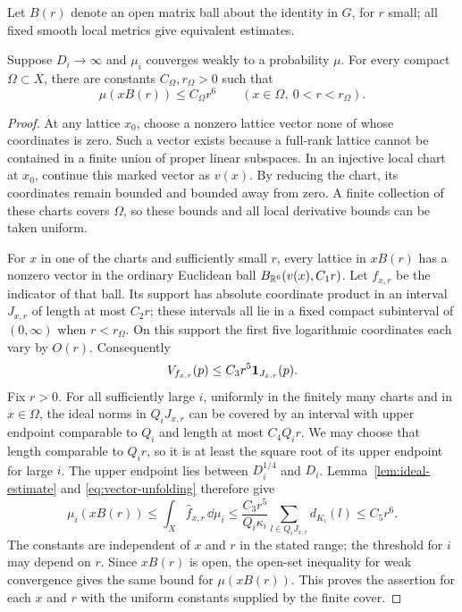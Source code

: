 Let $B(r)$ denote an open matrix ball about the identity in $G$, for
$r$ small; all fixed smooth local metrics give equivalent estimates.

\begin{proposition}
\label{prop:ball}
Suppose $D_i\to\infty$ and $\mu_i$ converges weakly to a probability
$\mu$.  For every compact $\Omega\subset X$, there are constants
$C_\Omega,r_\Omega>0$ such that
\[
 \mu(xB(r))\le C_\Omega r^6
       \qquad(x\in\Omega,\ 0<r<r_\Omega).
\]
\end{proposition}

\begin{proof}
At any lattice $x_0$, choose a nonzero lattice vector none of whose
coordinates is zero.  Such a vector exists because a full-rank lattice
cannot be contained in a finite union of proper linear subspaces.
In an injective local chart at $x_0$, continue this marked vector as
$v(x)$.  By reducing the chart, its coordinates remain bounded and
bounded away from zero.  A finite collection of these charts covers
$\Omega$, so these bounds and all local derivative bounds can be
taken uniform.

For $x$ in one of the charts and sufficiently small $r$, every lattice
in $xB(r)$ has a nonzero vector in the ordinary Euclidean ball
$B_{\mathbb R^6}(v(x),C_1r)$.  Let $f_{x,r}$ be the indicator of that ball.
Its support has absolute coordinate product in an interval $J_{x,r}$ of length
at most $C_2r$; these intervals all lie in a fixed compact subinterval
of $(0,\infty)$ when $r<r_\Omega$.  On this support the first five
logarithmic coordinates each vary by $O(r)$.  Consequently
\[
 V_{f_{x,r}}(p)\le C_3r^5\mathbf 1_{J_{x,r}}(p).
\]
Fix $r>0$.  For all sufficiently large $i$, uniformly in the finitely
many charts and in $x\in\Omega$, the ideal norms in $Q_iJ_{x,r}$
can be covered by an interval with upper endpoint comparable to $Q_i$
and length at most $C_4Q_ir$.  We may choose that length comparable
to $Q_ir$, so it is at least the square root of its upper endpoint
for large $i$.  The upper endpoint lies between $D_i^{1/4}$ and
$D_i$.  Lemma~\ref{lem:ideal-estimate} and
\eqref{eq:vector-unfolding} therefore give
\[
 \mu_i(xB(r))
 \le\int_X\widehat f_{x,r}\,\dd\mu_i
 \le\frac{C_3r^5}{Q_i\kappa_i}
       \sum_{l\in Q_iJ_{x,r}}d_{K_i}(l)
 \le C_5r^6.
\]
The constants are independent of $x$ and $r$ in the stated range;
the threshold for $i$ may depend on $r$.  Since $xB(r)$ is open,
the open-set inequality for weak convergence gives the same bound
for $\mu(xB(r))$.  This proves the assertion for each $x$ and $r$
with the uniform constants supplied by the finite cover.
\end{proof}

